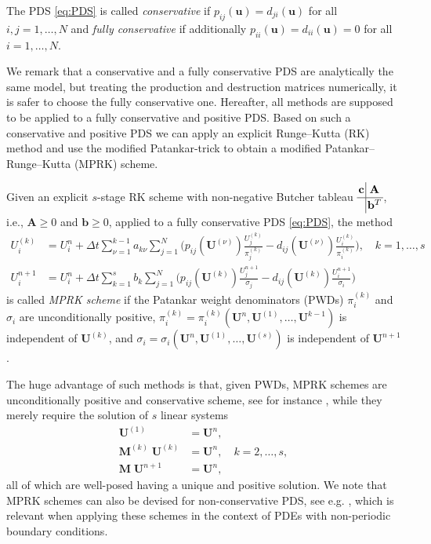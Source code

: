 \documentclass[final,11pt, times, linenumber, nopreprintline]{elsarticle}
\newcommand{\bU}{\bm U}
\begin{document}
\begin{dfn}
	The PDS \eqref{eq:PDS} is called \textit{conservative} if $p_{ij}(\mathbf u)=d_{ji}(\mathbf u)$ for all $i,j=1, \dots, N$ and \textit{fully conservative} if additionally $p_{ii}(\mathbf u) = d_{ii}(\mathbf u) = 0$ for all $i=1,\dots,N$.
\end{dfn}
We remark that a conservative and a fully conservative PDS are analytically the same model, but treating the production and destruction matrices numerically, it is safer to choose the fully conservative one. Hereafter, all methods are supposed to be applied to a fully conservative and positive PDS.
Based on such a conservative and positive PDS we can apply an explicit Runge--Kutta (RK) method and use the modified Patankar-trick to obtain a modified Patankar--Runge--Kutta (MPRK) scheme. 
	\begin{dfn}
	Given an explicit $s$-stage RK scheme with non-negative Butcher tableau $\arraycolsep=1.4pt\def\arraystretch{1.15}\begin{array}{c|c}
	\mathbf{c} & \mathbf{A} \\
	\hline
			   & \mathbf{b}^T
	\end{array}$, i.e., $\mathbf A \geq 0$ and $\mathbf b \geq 0$, applied to a fully conservative PDS \eqref{eq:PDS},
	the method
	\begin{align}%
		U_i^{(k)} &= U_i^n + \Delta t\sum_{\nu=1}^{k-1} a_{k\nu}
		\sum_{j=1}^N\biggl( p_{ij}(\mathbf{U}^{(\nu)})\frac{U_j^{(k)}}{\pi^{(k)}_j}-d_{ij}(\mathbf{U}^{(\nu)})\frac{U_i^{(k)}}{\pi^{(k)}_i}\biggr), \quad k=1,\dotsc,s\label{eq:MPRK_stages}\\	
        U_i^{n+1}&=U_i^n+\Delta t \sum_{k=1}^s b_k
		\sum_{j=1}^N\biggl( p_{ij}(\mathbf{U}^{(k)})\frac{U_j^{n+1}}{\sigma_j}-d_{ij}(\mathbf{U}^{(k)})\frac{U_i^{n+1}}{\sigma_i}\biggr)\label{eq:MPRK_final_update}
	\end{align}
	is called \emph{MPRK scheme} if the Patankar weight denominators (PWDs) $\pi_i^{(k)}$ and $\sigma_i$ are unconditionally positive, $\pi_i^{(k)}=\pi_i^{(k)}(\bU^n,\bU^{(1)}, \dots, \bU^{k-1})$ is independent of $\mathbf U^{(k)}$, and $\sigma_i=\sigma_i(\bU^n,\bU^{(1)}, \dots,\bU^{(s)})$ is independent of $\mathbf U^{n+1}$.
	\label{def:MPRK}
\end{dfn}
	The huge advantage of such methods is that, given PWDs, MPRK schemes are unconditionally positive and conservative scheme, see for instance \cite{kopecz_order_2018}, while they merely require the solution of $s$ linear systems
\begin{align*}
	\bU^{(1)}&=\bU^n,\\
	\mathbf{M}^{(k)}\; \bU^{(k)}&=\bU^n,\quad k=2,\dots,s,\\
	\mathbf{M} \; \bU^{n+1}&=\bU^n,
\end{align*}
all of which are well-posed having a unique and positive solution. We note that MPRK schemes can also be devised for non-conservative PDS, see e.g. \cite{TOR2022,IzginThesis}, which is relevant when applying these schemes in the context of PDEs with non-periodic boundary conditions.
\end{document}
